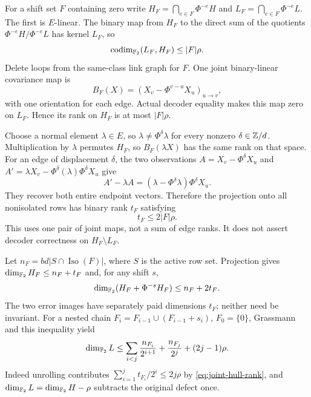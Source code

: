 \begin{outline}
For a shift set $F$ containing zero write
$H_F=\bigcap_{e\in F}\Phi^{-e}H$ and
$L_F=\bigcap_{e\in F}\Phi^{-e}L$. The first is $E$-linear. The binary
map from $H_F$ to the direct sum of the quotients
$\Phi^{-e}H/\Phi^{-e}L$ has kernel $L_F$, so
\begin{equation}\label{eq:hull-intersection-defect}
 \operatorname{codim}_{\mathbb{F}_2}(L_F,H_F)\le |F|\rho.
\end{equation}
Delete loops from the same-class link graph for $F$. One joint
binary-linear covariance map is
\[
 B_F(X)=(X_v-\Phi^{v-u}X_u)_{u\to v},
\]
with one orientation for each edge. Actual decoder equality makes this
map zero on $L_F$. Hence its rank on $H_F$ is at most $|F|\rho$.

Choose a normal element $\lambda\in E$, so
$\lambda\ne\Phi^\delta\lambda$ for every nonzero $\delta\in\mathbb{Z}/d$.
Multiplication by $\lambda$ permutes $H_F$, so $B_F(\lambda X)$ has the
same rank on that space. For an edge of displacement $\delta$, the two
observations $A=X_v-\Phi^\delta X_u$ and
$A'=\lambda X_v-\Phi^\delta(\lambda)\Phi^\delta X_u$ give
\[
 A'-\lambda A=(\lambda-\Phi^\delta\lambda)\Phi^\delta X_u.
\]
They recover both entire endpoint vectors. Therefore the projection onto
all nonisolated rows has binary rank $t_F$ satisfying
\begin{equation}\label{eq:joint-hull-rank}
 t_F\le2|F|\rho.
\end{equation}
This uses one pair of joint maps, not a sum of edge ranks. It does not
assert decoder correctness on $H_F\setminus L_F$.

Let $n_F=bd|S\cap\operatorname{Iso}(F)|$, where $S$ is the active row set.
Projection gives $\dim_{\mathbb{F}_2}H_F\le n_F+t_F$ and, for any shift $s$,
\[
 \dim_{\mathbb{F}_2}(H_F+\Phi^{-s}H_F)\le n_F+2t_F.
\]
The two error images have separately paid dimensions $t_F$; neither need
be invariant. For a nested chain $F_i=F_{i-1}\cup(F_{i-1}+s_i)$,
$F_0=\{0\}$, Grassmann and this inequality yield
\[
 \dim_{\mathbb{F}_2}L\le \sum_{i<j}\frac{n_{F_i}}{2^{i+1}}
                         +\frac{n_{F_j}}{2^j}+(2j-1)\rho.
\]
Indeed unrolling contributes $\sum_{i=1}^jt_{F_i}/2^i\le2j\rho$
by \eqref{eq:joint-hull-rank}, and
$\dim_{\mathbb{F}_2}L=\dim_{\mathbb{F}_2}H-\rho$ subtracts the original defect once.


\end{outline}
